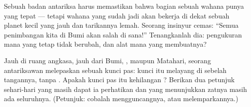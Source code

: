 \begin{exercise}[$\star\star$]\label{exo:g4:weight-and-mass:10}
Sebuah badan antariksa harus memastikan bahwa bagian sebuah wahana
punya  yang tepat --- tetapi wahana yang sudah jadi akan bekerja
di dekat sebuah planet kecil yang jauh dan tarikannya lemah. Seorang
insinyur cemas: ``Semua penimbangan kita di Bumi akan salah di sana!''
Tenangkanlah dia: pengukuran mana yang tetap tidak berubah, dan alat
mana yang membuatnya?
\end{exercise}

\begin{exercise}[$\star\star$]\label{exo:g4:weight-and-mass:11}
Jauh di ruang angkasa, jauh dari Bumi, , maupun Matahari, seorang
antariksawan melepaskan sebuah kunci pas: kunci itu melayang di
sebelah tangannya, tanpa . Apakah kunci pas itu kehilangan
? Berikan dua petunjuk sehari-hari yang masih dapat ia
perhatikan dan yang menunjukkan zatnya masih ada seluruhnya.
(Petunjuk: cobalah mengguncangnya, atau melemparkannya.)
\end{exercise}
